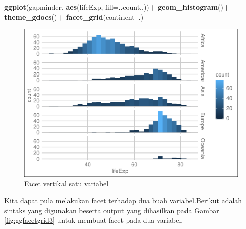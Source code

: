 \documentclass[]{book}
\newenvironment{Shaded}{\begin{snugshade}}{\end{snugshade}}
\newcommand{\KeywordTok}[1]{\textcolor[rgb]{0.13,0.29,0.53}{\textbf{#1}}}
\newcommand{\DataTypeTok}[1]{\textcolor[rgb]{0.13,0.29,0.53}{#1}}
\newcommand{\DecValTok}[1]{\textcolor[rgb]{0.00,0.00,0.81}{#1}}
\newcommand{\StringTok}[1]{\textcolor[rgb]{0.31,0.60,0.02}{#1}}
\newcommand{\OperatorTok}[1]{\textcolor[rgb]{0.81,0.36,0.00}{\textbf{#1}}}
\newcommand{\NormalTok}[1]{#1}
\begin{document}
\begin{Shaded}
\begin{Highlighting}[]
\KeywordTok{ggplot}\NormalTok{(gapminder, }\KeywordTok{aes}\NormalTok{(lifeExp, }\DataTypeTok{fill=}\NormalTok{..count..))}\OperatorTok{+}
\StringTok{  }\KeywordTok{geom_histogram}\NormalTok{()}\OperatorTok{+}
\StringTok{  }\KeywordTok{theme_gdocs}\NormalTok{()}\OperatorTok{+}
\StringTok{  }\KeywordTok{facet_grid}\NormalTok{(continent}\OperatorTok{~}\NormalTok{.)}
\end{Highlighting}
\end{Shaded}

\begin{figure}

{\centering \includegraphics[width=0.8\linewidth]{EnvStat_files/figure-latex/ggfacetgrid2-1} 

}

\caption{Facet vertikal satu variabel}\label{fig:ggfacetgrid2}
\end{figure}

Kita dapat pula melakukan facet terhadap dua buah variabel.Berikut
adalah sintaks yang digunakan beserta output yang dihasilkan pada Gambar
\ref{fig:ggfacetgrid3} untuk membuat facet pada dua variabel.

\begin{Shaded}
\end{Shaded}
\end{document}
